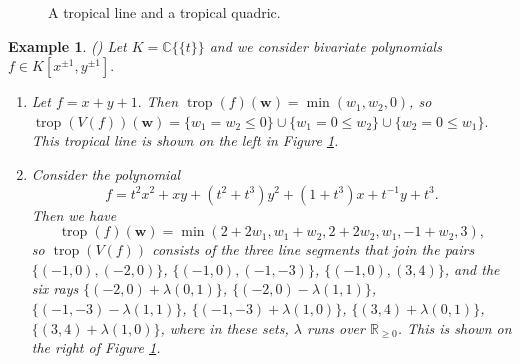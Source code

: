 \documentclass[11pt,reqno,a4paper]{article}
\theoremstyle{theoremstyle}
\theoremstyle{examplestyle}
\newtheorem{example}[theorem]{Example}
\theoremstyle{algorithmstyle}
\numberwithin{equation}{subsection}
\newcommand{\RR}{\mathbb{R}}
\newcommand{\puiseux}{\mathbb{C}\{\{t\}\}}
\DeclareMathOperator{\trop}{trop}
\begin{document}
\begin{figure}
    \centering
    \caption{A tropical line and a tropical quadric.}
    \label{fig:tropicallinequadric}
\end{figure}

\begin{example}
    (\cite[Ex. 3.1.2]{MS2015}) Let $K = \puiseux$ and we consider bivariate polynomials $f\in K[x^{\pm1},y^{\pm1}].$
    \begin{enumerate}[left = 1.9em]
        \item[(1)] Let $f=x+y+1.$ Then $\trop(f)(\mathbf{w}) = \min(w_1,w_2,0)$, so \\$\trop(V(f))(\mathbf{w}) = \{w_1 = w_2 \leq 0\} \cup \{w_1=0 \leq w_2\} \cup \{ w_2=0 \leq w_1\}.$ This tropical line is shown on the left in Figure \ref{fig:tropicallinequadric}.
        \item[(2)] Consider the polynomial \[f=t^2x^2 + xy + (t^2+t^3)y^2 + (1+t^3)x + t^{-1}y + t^3.\] Then we have \[\trop(f)(\mathbf{w}) = \min(2+2w_1, w_1+w_2, 2+2w_2, w_1, -1+w_2, 3),\] so $\trop(V(f))$ consists of the three line segments that join the pairs $\{(-1,0),(-2,0)\}$, $\{(-1,0),(-1,-3)\}$, $\{(-1,0),(3,4)\}$, and the six rays $\{(-2,0) + \lambda(0,1)\}$, $\{(-2,0) - \lambda(1,1)\}$, $\{(-1,-3) - \lambda(1,1)\}$, $\{(-1,-3) + \lambda(1,0)\}$, $\{(3,4) + \lambda(0,1)\}$, $\{(3,4) + \lambda(1,0)\}$, where in these sets, $\lambda$ runs over $\RR_{\geq0}$. This is shown on the right of Figure \ref{fig:tropicallinequadric}.
    \end{enumerate}
\end{example}
\end{document}

